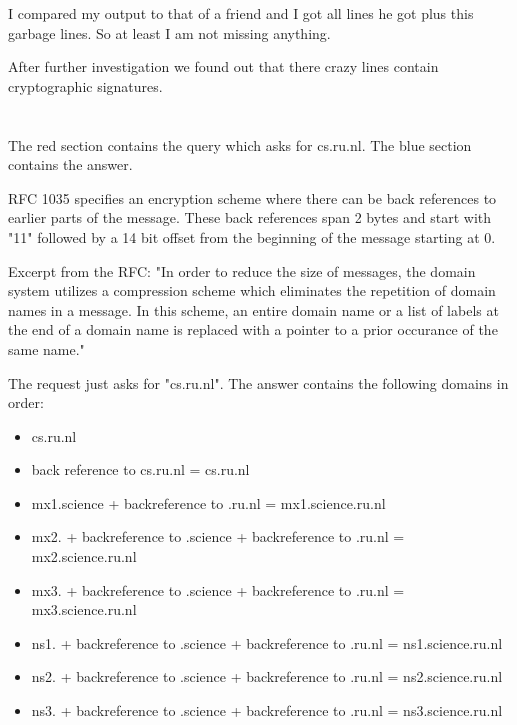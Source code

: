 \documentclass[12pt, a4paper]{article}
\begin{document}
\begin{enumerate}[a]
	I compared my output to that of a friend and I got all lines he got plus this garbage lines. So at least I am not missing anything.

	After further investigation we found out that there crazy lines contain cryptographic signatures.
\end{enumerate}

\section{} %
The red section contains the query which asks for cs.ru.nl. The blue section contains the answer.

RFC 1035 specifies an encryption scheme where there can be back references to earlier parts of the message. These back references span 2 bytes and start with "11" followed by a 14 bit offset from the beginning of the message starting at 0.

Excerpt from the RFC:
"In order to reduce the size of messages, the domain system utilizes a
compression scheme which eliminates the repetition of domain names in a
message.  In this scheme, an entire domain name or a list of labels at
the end of a domain name is replaced with a pointer to a prior occurance
of the same name."

The request just asks for "cs.ru.nl". The answer contains the following domains in order:
\begin{itemize}
	\item cs.ru.nl
	\item back reference to cs.ru.nl = cs.ru.nl
	\item mx1.science + backreference to .ru.nl = mx1.science.ru.nl
	\item mx2. + backreference to .science + backreference to .ru.nl = mx2.science.ru.nl
	\item mx3. + backreference to .science + backreference to .ru.nl = mx3.science.ru.nl
	\item ns1. + backreference to .science + backreference to .ru.nl = ns1.science.ru.nl
	\item ns2. + backreference to .science + backreference to .ru.nl = ns2.science.ru.nl
	\item ns3. + backreference to .science + backreference to .ru.nl = ns3.science.ru.nl
\end{itemize}
\end{document}

